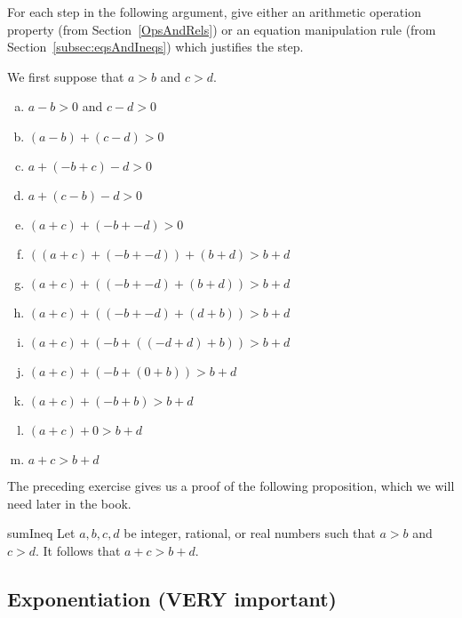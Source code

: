 \begin{exercise}{}
For each step in the following argument, give either an arithmetic operation property (from Section~\ref{OpsAndRels}) or an equation manipulation rule (from Section~\ref{subsec:eqsAndIneqs}) which justifies the step.

\noindent
We first suppose that $a>b$ and $c>d$. 
\begin{enumerate}[(a)]
\item
$a-b>0$ and $c-d>0$
\item
$(a-b) + (c-d) > 0$
\item
$a + (-b+c) - d > 0$
\item
$a + (c-b) - d > 0$
\item
$(a+c) + (-b + -d) > 0$
\item
$((a+c) + (-b + -d)) + (b+d) > b+d$
\item
$(a+c) + ((-b + -d) + (b+d)) > b+d$
\item
$(a+c) + ((-b + -d) + (d+b)) > b+d$
\item
$(a+c) + (-b + ((-d + d) +b)) > b+d$
\item
$(a+c) + (-b + (0 +b)) > b+d$
\item
$(a+c) + (-b + b) > b+d$
\item
$(a+c)  + 0 > b+d$
\item
$a+c > b+d$
\end{enumerate}
\end{exercise}

The preceding exercise gives us a proof of the following proposition, which we will need later in the book.

\begin{prop}{sumIneq}
Let $a,b,c,d$ be integer, rational, or real numbers such that $a>b$ and $c>d$.  It follows that  $a+c > b+d$.
\end{prop}

%
%

\subsection {Exponentiation (VERY important)}

